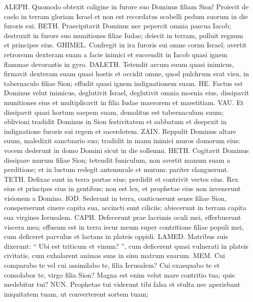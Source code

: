 \begin{biblechapter}
\begin{biblechapter}
 \verse ALEPH. Quomodo obtexit caligine in furore suo
 Dominus filiam Sion!
 Proiecit de caelo in terram
 gloriam Israel
 et non est recordatus scabelli pedum suorum
 in die furoris sui.
 \verse BETH. Praecipitavit Dominus
 nec pepercit omnia pascua Iacob;
 destruxit in furore suo
 munitiones filiae Iudae;
 deiecit in terram, polluit
 regnum et principes eius.
 \verse GHIMEL. Confregit in ira furoris sui
 omne cornu Israel;
 avertit retrorsum dexteram suam
 a facie inimici
 et succendit in Iacob quasi ignem flammae
 devorantis in gyro.
 \verse DALETH. Tetendit arcum suum quasi inimicus,
 firmavit dexteram suam quasi hostis
 et occidit omne,
 quod pulchrum erat visu,
 in tabernaculo filiae Sion;
 effudit quasi ignem indignationem suam.
 \verse HE. Factus est Dominus velut inimicus,
 deglutivit Israel,
 deglutivit omnia moenia eius,
 dissipavit munitiones eius
 et multiplicavit in filia Iudae
 maerorem et maestitiam.
 \verse VAU. Et dissipavit quasi hortum saepem suam,
 demolitus est tabernaculum suum; oblivioni tradidit Dominus in Sion festivitatem et sabbatum
 et despexit in indignatione furoris sui
 regem et sacerdotem.
 \verse ZAIN. Reppulit Dominus altare suum,
 maledixit sanctuario suo;
 tradidit in manu inimici
 muros domorum eius:
 vocem dederunt in domo Domini
 sicut in die sollemni.
 \verse HETH. Cogitavit Dominus dissipare
 murum filiae Sion;
 tetendit funiculum,
 non avertit manum suam a perditione;
 et in luctum redegit antemurale et murum:
 pariter elanguerunt.
 \verse TETH. Defixae sunt in terra portae eius;
 perdidit et contrivit vectes eius.
 Rex eius et principes eius in gentibus;
 non est lex,
 et prophetae eius non invenerunt
 visionem a Domino.
 \verse IOD. Sederunt in terra,
 conticuerunt senes filiae Sion,
 consperserunt cinere capita sua,
 accincti sunt ciliciis;
 abiecerunt in terram capita sua
 virgines Ierusalem.
 \verse CAPH. Defecerunt prae lacrimis oculi mei,
 efferbuerunt viscera mea;
 effusum est in terra iecur meum
 super contritione filiae populi mei,
 cum deficeret parvulus et lactans
 in plateis oppidi.
 \verse LAMED. Matribus suis dixerunt:
 “ Ubi est triticum et vinum? ”,
 cum deficerent quasi vulnerati
 in plateis civitatis,
 cum exhalarent animas suas
 in sinu matrum suarum.
 \verse MEM. Cui comparabo te vel cui assimilabo te,
 filia Ierusalem?
 Cui exaequabo te et consolabor te, virgo filia Sion?
 Magna est enim velut mare contritio tua;
 quis medebitur tui?
 \verse NUN. Prophetae tui viderunt tibi falsa et stulta
 nec aperiebant iniquitatem tuam,
 ut converterent sortem tuam;

\end{biblechapter}
\end{biblechapter}
